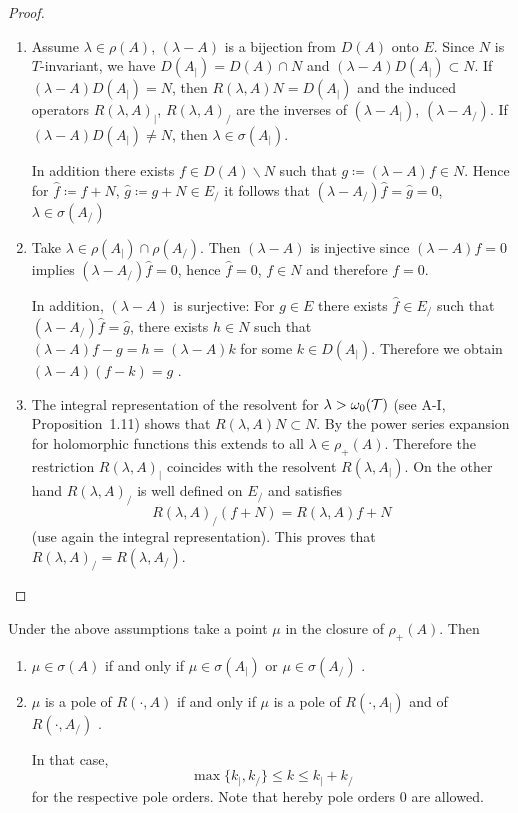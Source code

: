 \begin{proof}
\begin{enumerate}[\upshape (i), wide, labelindent=.5em]
\item 
Assume $\lambda \in \rho(A)$, \ie $(\lambda-A)$ is a bijection from $D(A)$ onto $E$.
Since $N$ is $T$-invariant, we have $D(A_{|}) = D(A) \cap N$ and $(\lambda-A)D(A_{|}) \subset N$.
If $(\lambda-A)D(A_{|}) = N$, then $R(\lambda,A)N = D(A_{|})$ and the induced operators $R(\lambda,A)_{|}$, \resp $R(\lambda,A)_{/}$ are the inverses of $(\lambda-A_{|})$, \resp $(\lambda-A_{/})$.
If $(\lambda-A)D(A_{|}) \neq N$, then $\lambda \in \sigma(A_{|})$.

In addition there exists $f \in D(A)\backslash N$ such that $g \coloneqq (\lambda-A)f \in N$.
Hence for $\hat{f} \coloneqq f+N$, $\hat{g} \coloneqq g+N \in E_{/}$ it follows that $(\lambda-A_{/})\hat{f} = \hat{g} = 0$, \ie $\lambda \in \sigma(A_{/})$

\item 
Take $\lambda \in \rho(A_{|}) \cap \rho(A_{/})$.
Then $(\lambda-A)$ is injective since $(\lambda-A)f = 0$ implies $(\lambda-A_{/})\hat{f}= 0$, hence $\hat{f} = 0$, \ie $f \in N$ and therefore $f = 0$.

In addition, $(\lambda-A)$ is surjective: For $g \in E$ there exists $\hat{f} \in E_{/}$ such that $(\lambda-A_{/})\hat{f} = \hat{g}$, \ie there exists $h \in N$ such that $(\lambda-A)f - g = h = (\lambda-A)k$ for some $k \in D(A_{|})$.
Therefore we obtain $(\lambda-A)(f-k) = g$ .

\item 
The integral representation of the resolvent for $\lambda > \omega_{0}(\mathcal{T})$ (see A-I, Proposition~1.11) shows that $R(\lambda,A)N \subset N$.
By the power series expansion for holomorphic functions this extends to all $\lambda \in \rho_{+}(A)$.
Therefore the restriction $R(\lambda,A)_{|}$ coincides with the resolvent $R(\lambda,A_{|})$.
On the other hand $R(\lambda,A)_{/}$ is well defined on $E_{/}$ and satisfies
\[
R(\lambda,A)_{/}(f+N) = R(\lambda,A)f + N
\]
(use again the integral representation).
This proves that $R(\lambda,A)_{/} = R(\lambda,A_{/})$.
\end{enumerate}
\end{proof}
\begin{corollary}\label{cor:a3-4.3}
Under the above assumptions take a point $\mu$ in the closure of $\rho_{+}(A)$.
Then
\begin{enumerate}[\upshape (i)]
\item 
$\mu \in \sigma(A)$ if and only if $\mu \in \sigma(A_{|})$ or $\mu \in \sigma(A_{/})$ .

\item 
$\mu$ is a pole of $R(\cdot,A)$ if and only if $\mu$ is a pole of $R(\cdot,A_{|})$ and of $R(\cdot,A_{/})$ .

In that case,
\[
\max\{k_{|},k_{/}\} \leq k \leq k_{|} + k_{/}
\]
for the respective pole orders. Note that hereby pole orders $0$ are allowed.
\end{enumerate}
\end{corollary}

